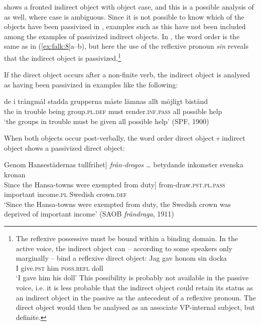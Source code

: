 \documentclass[output=paper]{langscibook}
\begin{document}
 shows a fronted indirect object with object case, and this is a possible analysis of  as well, where case is ambiguous. Since it is not possible to know which of the objects have been passivized in , examples such as this have not been included among the examples of passivized indirect objects. In , the word order is the same as in (\ref{ex:falk:8}a–b), but here the use of the reflexive pronoun \textit{sin} reveals that the indirect object is passivized.\footnote{The reflexive possessive must be bound within a binding domain. In the active voice, the indirect object can – according to some speakers only marginally – bind a reflexive direct object: 
\ea \gll Jag  gav    honom    sin    docka\\
     I      give.\textsc{pst}  him      \textsc{poss}.\textsc{refl}  doll\\
    \glt ‘I gave him his doll’
\z This possibility is probably not available in the passive voice, i.e. it is less probable that the indirect object could retain its status as an indirect object in the passive as the antecedent of a reflexive pronoun. The direct object would then be analysed as an associate VP-internal subject, but definite.}


If the direct object occurs after a non-finite verb, the indirect object is analysed as having been passivized in examples like the following:\largerpage

\ea%
    \label{ex:falk:9}
\gll de  i     trångmål  stadda  grupperna    måste  lämnas          allt  möjligt    bistånd\\
    the  in  trouble    being    group\textsc{.pl.def}   must  render\textsc{.inf}.\textsc{pass}  all    possible  help\\
\glt ‘the groups in trouble must be given all possible help’ (SPF, 1900)
\z


When both objects occur post-verbally, the word order direct object\,+\,indirect object shows a passivized direct object:

\ea%
    \label{ex:falk:10}
            {\ob}Genom Hansestädernas tullfrihet]               \textit{från-drogos …} betydande   inkomster  svenska    kronan \\
    {\ob}Since the Hansa-towns were exempted from duty]   from-draw\textsc{.pst.pl}.\textsc{pass}    important   income\textsc{.pl}  Swedish   crown.\textsc{def}\\
\glt ‘Since the Hansa-towns were exempted from duty, the Swedish crown was deprived of important income’ (SAOB \textit{fråndraga}, 1911)
\z
\end{document}
